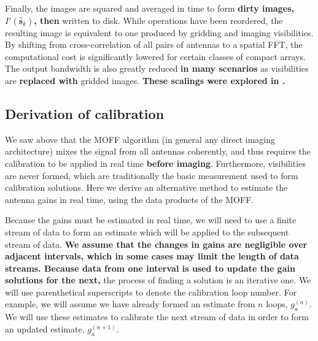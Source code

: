 \documentclass[a4paper,fleqn,usenatbib]{../mnras}
\begin{document}
Finally, the images are squared and averaged in time to form \textbf{dirty images, 
$I'(\hat{\mathbf{s}}_k)$, then} written 
to disk. While operations have been reordered, the resulting image is equivalent to one 
produced by gridding and imaging visibilities. By shifting from cross-correlation of all pairs of 
antennas to a spatial FFT, the computational cost is significantly lowered for certain classes of 
compact arrays. The output bandwidth is also greatly reduced \textbf{in many scenarios} as visibilities are \textbf{replaced with} 
gridded images. \textbf{These scalings were explored in \citealt{thy15c}.}

\subsection{Derivation of calibration}
We saw above that the MOFF algorithm (in general any direct imaging architecture) mixes the 
signal from all antennas coherently, and thus requires the calibration to be applied in real time 
\textbf{before imaging}. Furthermore, visibilities are never formed, which are 
traditionally the basic measurement used to form calibration solutions. Here we derive an 
alternative method to estimate the antenna gains in real time, using the data products of the 
MOFF. 

Because the gains must be estimated in real time, we will need to use a finite stream of data to 
form an estimate which will be applied to the subsequent stream of data. 
\textbf{We assume that the changes in gains are negligible over adjacent intervals, which 
in some cases may limit the length of data streams.
Because data from one interval is used to update the gain solutions for the next,} the 
process of finding a solution is an iterative one. We will use parenthetical superscripts to 
denote the calibration loop number. For example, we will assume we have already formed an 
estimate from $n$ loops, $g^{(n)}_a$. We will use these estimates to calibrate the next stream 
of data in order to form an updated estimate, $g^{(n+1)}_a$.
\end{document}
